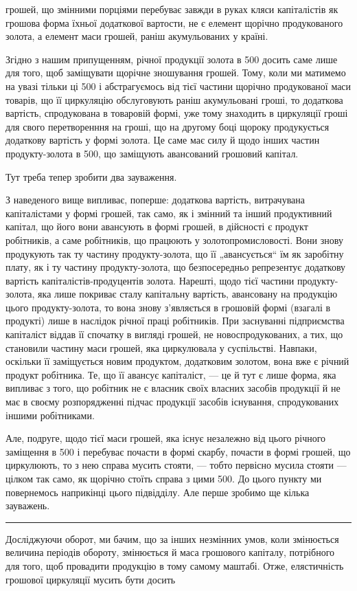 \parcont{}  %
грошей, що змінними порціями перебуває завжди в руках кляси капіталістів
як грошова форма їхньої додаткової вартости, не є елемент
щорічно продукованого золота, а елемент маси грошей, раніш акумульованих
у країні.

Згідно з нашим припущенням, річної продукції золота в 500
досить саме лише для того, щоб заміщувати щорічне зношування грошей.
Тому, коли ми матимемо на увазі тільки ці 500 і абстрагуємось
від тієї частини щорічно продукованої маси товарів, що її циркуляцію
обслуговують раніш акумульовані гроші, то додаткова вартість, спродукована
в товаровій формі, уже тому знаходить в циркуляції гроші для
свого перетворенння на гроші, що на другому боці щороку продукується
додаткову вартість у формі золота. Це саме має силу й щодо інших частин
продукту-золота в 500, що заміщують авансований грошовий
капітал.

Тут треба тепер зробити два зауваження.

З наведеного вище випливає, поперше: додаткова вартість, витрачувана
капіталістами у формі грошей, так само, як і змінний та інший
продуктивний капітал, що його вони авансують в формі грошей, в
дійсності є продукт робітників, а саме робітників, що працюють у
золотопромисловості. Вони знову продукують так ту частину продукту-золота,
що її „авансується“ їм як заробітну плату, як і ту частину
продукту-золота, що безпосередньо репрезентує додаткову вартість
капіталістів-продуцентів золота. Нарешті, щодо тієї частини продукту-золота,
яка лише покриває сталу капітальну вартість, авансовану на
продукцію цього продукту-золота, то вона знову з’являється в грошовій
формі (взагалі в продукті) лише в наслідок річної праці робітників.
При заснуванні підприємства капіталіст віддав її спочатку в вигляді
грошей, не новоспродукованих, а тих, що становили частину маси грошей,
яка циркулювала у суспільстві. Навпаки, оскільки її заміщується новим
продуктом, додатковим золотом, вона вже є річний продукт робітника.
Те, що її авансує капіталіст, — це й тут є лише форма, яка випливає з
того, що робітник не є власник своїх власних засобів продукції й не
має в своєму розпорядженні підчас продукції засобів існування, спродукованих
іншими робітниками.

Але, подруге, щодо тієї маси грошей, яка існує незалежно від цього
річного заміщення в 500 і перебуває почасти в формі скарбу,
почасти в формі грошей, що циркулюють, то з нею справа мусить
стояти, — тобто первісно мусила стояти — цілком так само, як щорічно
стоїть справа з цими 500. До цього пункту ми повернемось
наприкінці цього підвідділу. Але перше зробимо ще кілька зауважень.

\pfbreak

Досліджуючи оборот, ми бачим, що за інших незмінних умов, коли
змінюється величина періодів обороту, змінюється й маса грошового
капіталу, потрібного для того, щоб провадити продукцію в тому самому
маштабі. Отже, елястичність грошової циркуляції мусить бути досить
\parbreak{}  %
